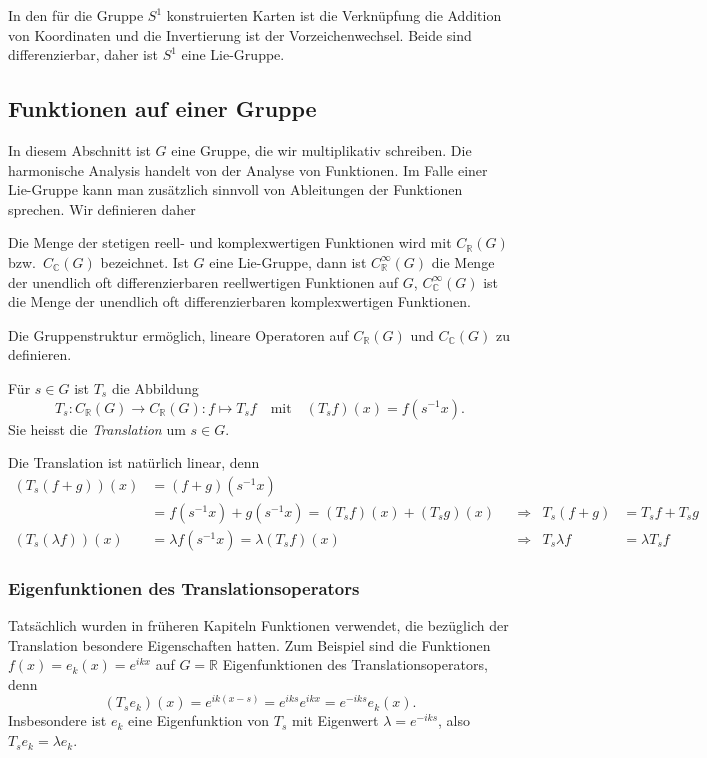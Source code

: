 In den für die Gruppe $S^1$ konstruierten Karten ist die Verknüpfung die
Addition von Koordinaten und die Invertierung ist der Vorzeichenwechsel.
Beide sind differenzierbar, daher ist $S^1$ eine Lie-Gruppe.

%
%
\subsection{Funktionen auf einer Gruppe
\label{buch:gruppen:subsection:funktionen}}
In diesem Abschnitt ist $G$ eine Gruppe, die wir multiplikativ
schreiben.
Die harmonische Analysis handelt von der Analyse von Funktionen.
Im Falle einer Lie-Gruppe kann man zusätzlich sinnvoll von Ableitungen
der Funktionen sprechen.
Wir definieren daher

\begin{definition}
Die Menge der stetigen reell- und komplexwertigen Funktionen wird mit
$C_{\mathbb{R}}(G)$ bzw.~$C_{\mathbb{C}}(G)$ bezeichnet.
Ist $G$ eine Lie-Gruppe, dann ist
$C_{\mathbb{R}}^\infty(G)$ die Menge der unendlich oft differenzierbaren
reellwertigen Funktionen auf $G$,
$C_{\mathbb{C}}^\infty(G)$ ist die Menge der unendlich oft differenzierbaren
komplexwertigen Funktionen.
\end{definition}

Die Gruppenstruktur ermöglich, lineare Operatoren auf $C_{\mathbb{R}}(G)$
und $C_{\mathbb{C}}(G)$ zu definieren.

\begin{definition}
Für $s\in G$ ist $T_s$ die Abbildung
\[
T_s
\colon
C_{\mathbb{R}}(G) \to C_{\mathbb{R}}(G)
:
f \mapsto T_sf
\quad
\text{mit}
\quad
(T_sf)(x) = f(s^{-1}x).
\]
Sie heisst die {\em Translation} um $s\in G$.
\end{definition}

Die Translation ist natürlich linear, denn
\begin{align*}
(T_s(f+g))(x)
&=
(f+g)(s^{-1}x)
\\
&=
f(s^{-1}x) + g(s^{-1}x)
=
(T_sf)(x) + (T_sg)(x)
&&\Rightarrow&
T_s(f+g)&=T_sf+T_sg
\\
(T_s(\lambda f))(x)
&=
\lambda f(s^{-1}x)
=
\lambda (T_sf)(x)
&&\Rightarrow&
T_s\lambda f
&=
\lambda T_sf
\end{align*}

%
%
\subsubsection{Eigenfunktionen des Translationsoperators}
Tatsächlich wurden in früheren Kapiteln Funktionen verwendet, die
bezüglich der Translation besondere Eigenschaften hatten.
Zum Beispiel sind die Funktionen $f(x)=e_k(x)=e^{ikx}$ auf $G=\mathbb{R}$
Eigenfunktionen des Translationsoperators, denn
\[
(T_se_k)(x)
=
e^{ik(x-s)}
=
e^{iks}e^{ikx}
=
e^{-iks} e_k(x).
\]
Insbesondere ist $e_k$ eine Eigenfunktion von $T_s$ mit Eigenwert
$\lambda=e^{-iks}$, also $T_se_k = \lambda e_k$.

